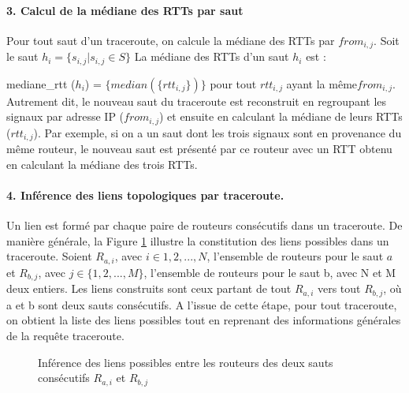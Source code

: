 \paragraph{3. Calcul de la médiane des RTTs par saut} Pour tout saut d'un traceroute,  on calcule la médiane des RTTs par $from_{i,j}$. Soit le saut $h_i =\{s_{i,j} |  s_{i,j} \in S  \}$
La médiane des RTTs d'un saut $h_i$ est  :

mediane\_rtt ($h_i$) =  $\{median(\{rtt_{i, j}  \})\}$
pour tout  $rtt_{i, j} $ ayant  la même$ from_{i, j} $. Autrement dit, le nouveau saut du traceroute est reconstruit en regroupant les signaux par adresse IP ($ from_{i, j} $) et ensuite en calculant la médiane de leurs RTTs ($rtt_{i,j}$). Par exemple, si on a un saut dont les trois signaux sont en provenance du même routeur, le nouveau saut est présenté par ce routeur avec un RTT obtenu en calculant la médiane des trois RTTs.




\paragraph{4. Inférence des liens topologiques par traceroute.} Un lien  est formé par chaque paire de routeurs consécutifs dans un traceroute. De manière générale, la Figure \ref{fig:link-inference} illustre la constitution des liens possibles  dans un traceroute. Soient  $R_{a,i}$, avec $i \in {1,2, ...,N}$,  l'ensemble de routeurs pour le saut $a$ et $R_{b,j}$, avec $j \in \{1,2, ..., M\}$, l'ensemble  de routeurs pour le saut b, avec N et M deux entiers. Les liens  construits sont ceux partant de tout $R_{a,i}$ vers tout $R_{b,j}$, où a et b sont deux sauts consécutifs. A l'issue de cette étape, pour tout traceroute, on obtient la liste des liens possibles tout en reprenant des informations générales de la requête traceroute.
\begin{figure}[H]
	\centering
	\captionsetup{justification=centering}
	\resizebox{0.3\textwidth}{!}{
	
}
	\caption{Inférence des liens possibles entre les routeurs des deux sauts consécutifs $R_{a,i}$ et $R_{b,j}$}
	\label{fig:link-inference}
\end{figure}
